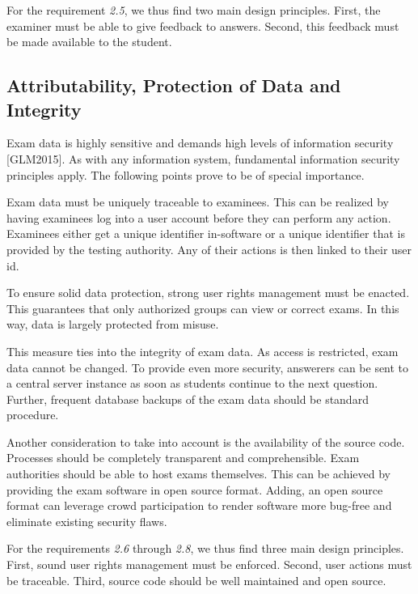 For the requirement \emph{2.5}, we thus find two main design principles.
First, the examiner must be able to give feedback to answers. Second,
this feedback must be made available to the student.

\hypertarget{attributability-protection-of-data-and-integrity}{%
\subsection{Attributability, Protection of Data and
Integrity}\label{attributability-protection-of-data-and-integrity}}

Exam data is highly sensitive and demands high levels of information
security {[}GLM2015{]}. As with any information system, fundamental
information security principles apply. The following points prove to be
of special importance.

Exam data must be uniquely traceable to examinees. This can be realized
by having examinees log into a user account before they can perform any
action. Examinees either get a unique identifier in-software or a unique
identifier that is provided by the testing authority. Any of their
actions is then linked to their user id.

To ensure solid data protection, strong user rights management must be
enacted. This guarantees that only authorized groups can view or correct
exams. In this way, data is largely protected from misuse.

This measure ties into the integrity of exam data. As access is
restricted, exam data cannot be changed. To provide even more security,
answerers can be sent to a central server instance as soon as students
continue to the next question. Further, frequent database backups of the
exam data should be standard procedure.

Another consideration to take into account is the availability of the
source code. Processes should be completely transparent and
comprehensible. Exam authorities should be able to host exams
themselves. This can be achieved by providing the exam software in open
source format. Adding, an open source format can leverage crowd
participation to render software more bug-free and eliminate existing
security flaws.

For the requirements \emph{2.6} through \emph{2.8}, we thus find three
main design principles. First, sound user rights management must be
enforced. Second, user actions must be traceable. Third, source code
should be well maintained and open source.

